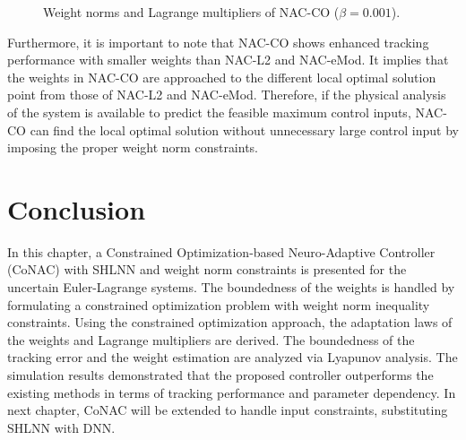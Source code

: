 \begin{figure}[!t]      
    \centering
    \vfill
    \caption{Weight norms and Lagrange multipliers of NAC-CO ($\beta=0.001$).}
    \label{chap3:fig:weight_multiplier NAC-CO}
\end{figure}

Furthermore, it is important to note that NAC-CO shows enhanced tracking performance with smaller weights than NAC-L2 and NAC-eMod.
It implies that the weights in NAC-CO are approached to the different local optimal solution point from those of NAC-L2 and NAC-eMod.
Therefore, if the physical analysis of the system is available to predict the feasible maximum control inputs, NAC-CO can find the local optimal solution without unnecessary large control input by imposing the proper weight norm constraints.

\section{Conclusion}

In this chapter, a Constrained Optimization-based Neuro-Adaptive Controller  \allowbreak (CoNAC) with SHLNN and weight norm constraints is presented for the uncertain Euler-Lagrange systems.
The boundedness of the weights is handled by formulating a constrained optimization problem with weight norm inequality constraints.
Using the constrained optimization approach, the adaptation laws of the weights and Lagrange multipliers are derived.
The boundedness of the tracking error and the weight estimation are analyzed via Lyapunov analysis.
The simulation results demonstrated that the proposed controller outperforms the existing methods in terms of tracking performance and parameter dependency.
In next chapter, CoNAC will be extended to handle input constraints, substituting SHLNN with DNN.

